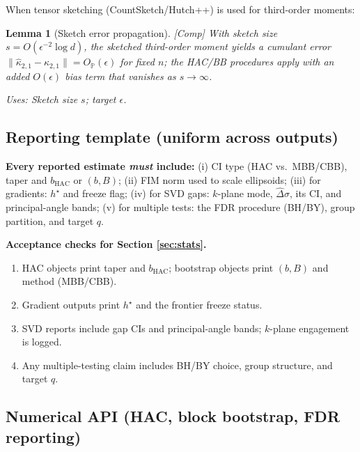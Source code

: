 \documentclass[10pt]{article}
\newcommand{\uses}[1]{\par\smallskip\noindent\textit{Uses: }#1\par\smallskip}
\newtheorem{lemma}{Lemma}
\begin{document}
When tensor sketching (CountSketch/Hutch++) is used for third-order moments:

\begin{lemma}[Sketch error propagation]\label{lem:sketch}
\emph{[\textup{Comp}]}
With sketch size $s=O(\epsilon^{-2}\log d)$, the sketched third-order moment yields a cumulant error $\|\widehat\kappa_{2,1}-\kappa_{2,1}\|=O_{\mathbb P}(\epsilon)$ for fixed $n$; the HAC/BB procedures apply with an added $O(\epsilon)$ bias term that vanishes as $s\to\infty$.
\uses{Sketch size $s$; target $\epsilon$.}
\end{lemma}

\subsection{Reporting template (uniform across outputs)}\label{subsec:report}

\begin{mdframed}
\textbf{Every reported estimate \emph{must} include:}
(i) CI type (HAC vs.\ MBB/CBB), taper and $b_{\mathrm{HAC}}$ or $(b,B)$;
(ii) FIM norm used to scale ellipsoids;
(iii) for gradients: $h^\star$ and freeze flag;
(iv) for SVD gaps: $k$-plane mode, $\widehat\Delta\sigma$, its CI, and principal-angle bands; 
(v) for multiple tests: the FDR procedure (BH/BY), group partition, and target $q$.
\end{mdframed}

\begin{mdframed}
\textbf{Acceptance checks for Section \ref{sec:stats}.}
\begin{enumerate}[leftmargin=*]
\item HAC objects print taper and $b_{\mathrm{HAC}}$; bootstrap objects print $(b,B)$ and method (MBB/CBB).
\item Gradient outputs print $h^\star$ and the frontier freeze status.
\item SVD reports include gap CIs and principal-angle bands; $k$-plane engagement is logged.
\item Any multiple-testing claim includes BH/BY choice, group structure, and target $q$.
\end{enumerate}
\end{mdframed}

\subsection*{Numerical API (HAC, block bootstrap, FDR reporting)}
\end{document}
